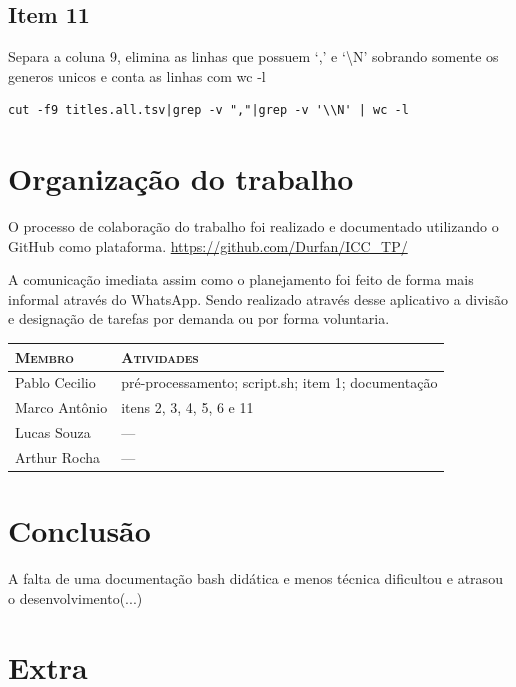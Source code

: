 \documentclass[12pt]{article}
\begin{document}
\subsection*{Item 11}

Separa a coluna 9, elimina as linhas que possuem `,' e `\textbackslash N' sobrando somente os generos unicos e conta as linhas com wc -l

\begin{verbatim}
cut -f9 titles.all.tsv|grep -v ","|grep -v '\\N' | wc -l
\end{verbatim}

\section{Organização do trabalho}

O processo de colaboração do trabalho foi realizado e documentado utilizando o GitHub como plataforma. \url{https://github.com/Durfan/ICC_TP/}

A comunicação imediata assim como o planejamento foi feito de forma mais informal através do WhatsApp. Sendo realizado através desse aplicativo a divisão e designação de tarefas por demanda ou por forma voluntaria.

\begin{table}[!h]
    \begin{tabular}{p{5cm}p{7.5cm}}
    
        \textsc{Membro}      & \textsc{Atividades} \\ 
	    \hline
        Pablo Cecilio & pré-processamento; script.sh; item 1; documentação \\ 
        Marco Antônio & itens 2, 3, 4, 5, 6 e 11\\
        Lucas Souza & --- \\
        Arthur Rocha & --- \\

    \end{tabular}
\end{table}

\section{Conclusão}

A falta de uma documentação bash didática e menos técnica dificultou e atrasou o desenvolvimento(...)

\pagebreak
\section{Extra}
\end{document}
